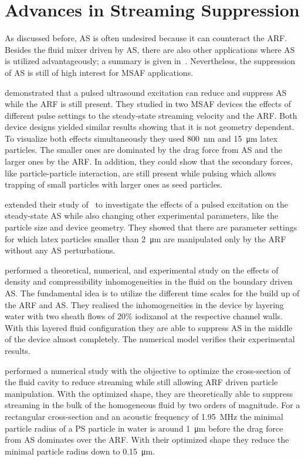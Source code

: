\section{Advances in Streaming Suppression}

As discussed before, AS is often undesired because it can counteract the ARF. 
Besides the fluid mixer driven by AS, there are also other applications where 
AS is utilized advantageously; a summary is given in~\cite{Wiklund2012a}. 
Nevertheless, the suppression of AS is still of high interest for MSAF 
applications.

 demonstrated that a pulsed ultrasound excitation can reduce 
and suppress AS while the ARF is still present. They studied in two MSAF 
devices the effects of different pulse settings to the steady-state streaming 
velocity and the ARF. Both device designs yielded similar results showing that 
it is not geometry dependent. To visualize both effects simultaneously they 
used \SI{800}{\nm} and \SI{15}{\um} latex particles. The smaller ones are 
dominated by the drag force from AS and the larger ones by the ARF. In 
addition, they could show that the secondary forces, like particle-particle 
interaction, are still present while pulsing which allows trapping of small 
particles with larger ones as seed particles.

 extended their study of~\cite{Hoyos2013} to investigate the 
effects of a pulsed excitation on the steady-state AS while also changing other 
experimental parameters, like the particle size and device geometry. They 
showed that there are parameter settings for which latex particles smaller than 
\SI{2}{\um} are manipulated only by the ARF without any AS perturbations.

 performed a theoretical, numerical, and experimental study 
on the effects of density and compressibility inhomogeneities in the fluid on 
the boundary driven AS. The fundamental idea is to utilize the different time 
scales for the build up of the ARF and AS. They realised the inhomogeneities in 
the device by layering water with two sheath flows of 20\% iodixanol at the 
respective channel walls. With this layered fluid configuration they are able 
to suppress AS in the middle of the device almost completely. The numerical 
model verifies their experimental results.

 performed a numerical study with the objective to optimize the 
cross-section of the fluid cavity to reduce streaming while still allowing ARF 
driven particle manipulation. With the optimized shape, they are theoretically 
able to suppress streaming in the bulk of the homogeneous fluid by two orders 
of magnitude. For a rectangular cross-section and an acoustic frequency of 
\SI{1.95}{\mega\hertz} the minimal particle radius of a PS particle in water is 
around \SI{1}{\um} before the drag force from AS dominates over the ARF. With 
their optimized shape they reduce the minimal particle radius down to 
\SI{0.15}{\um}.

